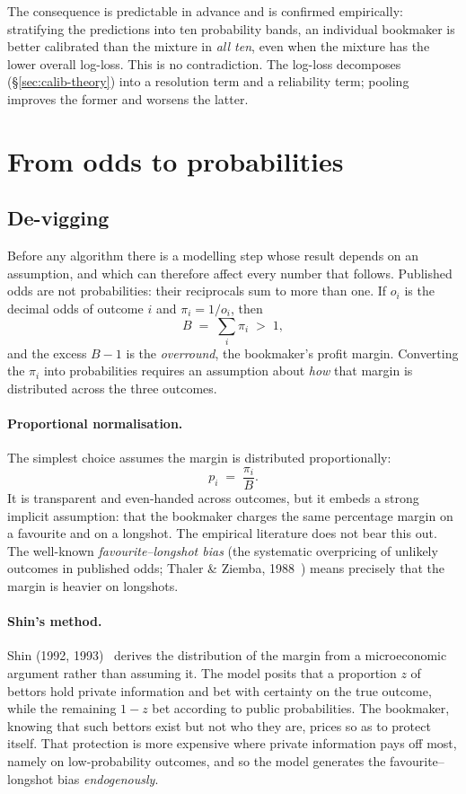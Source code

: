 \documentclass[12pt,a4paper,oneside]{report}
\renewcommand{\_}{\oldunderscore\allowbreak}
\theoremstyle{definition}
\theoremstyle{plain}
\theoremstyle{definition}   %
\begin{document}
The consequence is predictable in advance and is confirmed empirically: stratifying the
predictions into ten probability bands, an individual bookmaker is better calibrated than the
mixture in \emph{all ten}, even when the mixture has the lower overall log-loss. This is no
contradiction. The log-loss decomposes (\S\ref{sec:calib-theory}) into a resolution term and a
reliability term; pooling improves the former and worsens the latter.

\section{From odds to probabilities}

\subsection{De-vigging}
\label{sec:devig-theory}

Before any algorithm there is a modelling step whose result depends on an assumption, and which
can therefore affect every number that follows. Published odds are not probabilities: their reciprocals sum to more than one. If $o_i$ is the decimal odds of outcome
$i$ and $\pi_i = 1/o_i$, then
\[
B \;=\; \sum_{i} \pi_i \;>\; 1,
\]
and the excess $B-1$ is the \emph{overround}, the bookmaker's profit margin. Converting the
$\pi_i$ into probabilities requires an assumption about \emph{how} that margin is distributed
across the three outcomes.

\paragraph{Proportional normalisation.} The simplest choice assumes the margin is distributed
proportionally:
\[
p_i \;=\; \frac{\pi_i}{B}.
\]
It is transparent and even-handed across outcomes, but it embeds a strong implicit assumption:
that the bookmaker charges the same percentage margin on a favourite and on a longshot. The
empirical literature does not bear this out. The well-known \emph{favourite--longshot bias}
(the systematic overpricing of unlikely outcomes in published odds; Thaler \& Ziemba,
1988~\cite{thalerziemba1988}) means precisely that the margin is heavier on longshots.

\paragraph{Shin's method.} Shin (1992, 1993)~\cite{shin1992,shin1993} derives the distribution of the margin from a
microeconomic argument rather than assuming it. The model posits that a proportion $z$ of
bettors hold private information and bet with certainty on the true outcome, while the
remaining $1-z$ bet according to public probabilities. The bookmaker, knowing that such bettors
exist but not who they are, prices so as to protect itself. That protection is more expensive
where private information pays off most, namely on low-probability outcomes, and so the model
generates the favourite--longshot bias \emph{endogenously}.
\end{document}

